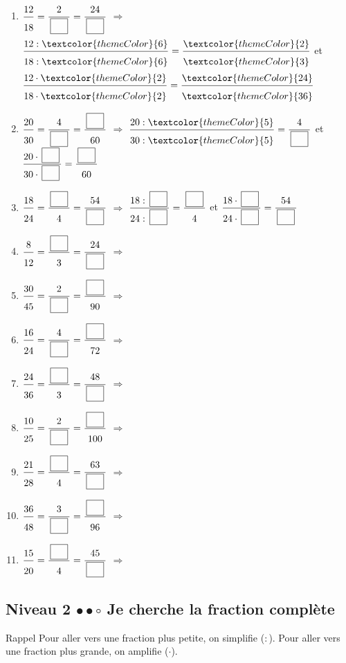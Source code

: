 \begin{enumerate}[leftmargin=*,align=parleft, label=\alph*), itemsep=9pt]
\item $\FA{12}{18}=\FA{2}{\CaseC}=\FA{24}{\CaseC}$ \quad $\Longrightarrow$ \quad $\FA{12 : \textcolor{themeColor}{6}}{18 : \textcolor{themeColor}{6}}=\FA{\textcolor{themeColor}{2}}{\textcolor{themeColor}{3}}$ \quad et \quad $\FA{12 \cdot \textcolor{themeColor}{2}}{18 \cdot \textcolor{themeColor}{2}}=\FA{\textcolor{themeColor}{24}}{\textcolor{themeColor}{36}}$
\item $\FA{20}{30}=\FA{4}{\CaseC}=\FA{\CaseC}{60}$ \quad $\Longrightarrow$ \quad $\FA{20 : \textcolor{themeColor}{5}}{30 : \textcolor{themeColor}{5}}=\FA{4}{\CaseC}$ \quad et \quad $\FA{20 \cdot \CaseC}{30 \cdot \CaseC}=\FA{\CaseC}{60}$
\item $\FA{18}{24}=\FA{\CaseC}{4}=\FA{54}{\CaseC}$ \quad $\Longrightarrow$ \quad $\FA{18 : \CaseC}{24 : \CaseC}=\FA{\CaseC}{4}$ \quad et \quad $\FA{18 \cdot \CaseC}{24 \cdot \CaseC}=\FA{54}{\CaseC}$
\item $\FA{8}{12}=\FA{\CaseC}{3}=\FA{24}{\CaseC}$ \quad $\Longrightarrow$
\item $\FA{30}{45}=\FA{2}{\CaseC}=\FA{\CaseC}{90}$ \quad $\Longrightarrow$
\item $\FA{16}{24}=\FA{4}{\CaseC}=\FA{\CaseC}{72}$ \quad $\Longrightarrow$
\item $\FA{24}{36}=\FA{\CaseC}{3}=\FA{48}{\CaseC}$ \quad $\Longrightarrow$
\item $\FA{10}{25}=\FA{2}{\CaseC}=\FA{\CaseC}{100}$ \quad $\Longrightarrow$
\item $\FA{21}{28}=\FA{\CaseC}{4}=\FA{63}{\CaseC}$ \quad $\Longrightarrow$
\item $\FA{36}{48}=\FA{3}{\CaseC}=\FA{\CaseC}{96}$ \quad $\Longrightarrow$
\item $\FA{15}{20}=\FA{\CaseC}{4}=\FA{45}{\CaseC}$ \quad $\Longrightarrow$
\end{enumerate}
 
\newpage
\subsection{Niveau 2 \quad $\bullet\bullet\circ$ \quad Je cherche la fraction complète}
 
 
\begin{astuce}{Rappel}
Pour aller vers une fraction plus petite, on simplifie ($:$). Pour aller vers une fraction plus grande, on amplifie ($\cdot$).
\end{astuce}
 
